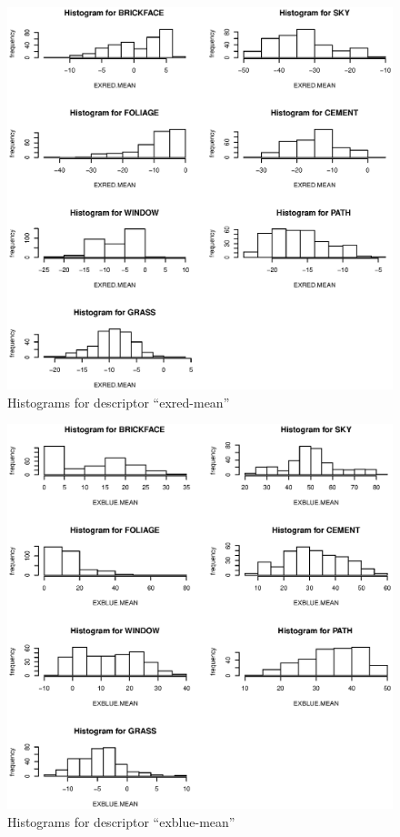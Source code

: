 \documentclass{article}
\begin{document}
\begin{figure}[htp]
\centering
\includegraphics[width=12cm]{a14.eps}
\caption{Histograms for descriptor ``exred-mean''}
\end{figure}

\begin{figure}[htp]
\centering
\includegraphics[width=12cm]{a15.eps}
\caption{Histograms for descriptor ``exblue-mean''}
\end{figure}
\end{document}
